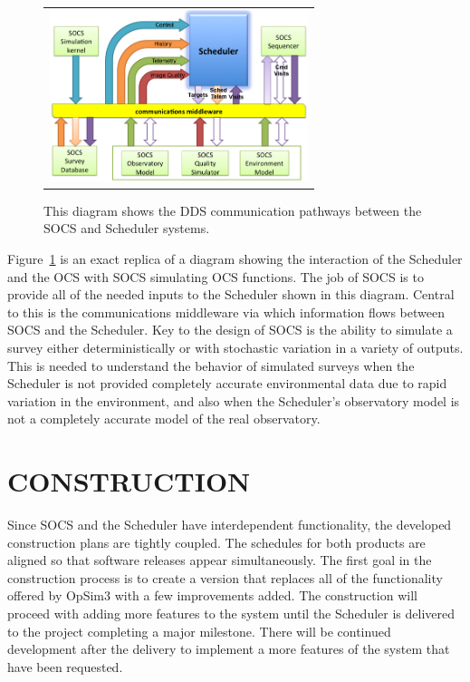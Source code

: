 \documentclass[]{spie}  %
\begin{document}
\begin{figure} [ht]
	\begin{center}
		\begin{tabular}{c}
			\includegraphics[height=5cm]{CommFlow.png}
		\end{tabular}
	\end{center}
	\caption[example]
	{ \label{fig:commflow} 
		This diagram shows the DDS communication pathways between the SOCS and Scheduler systems.}
\end{figure}

Figure~\ref*{fig:commflow} is an exact replica of a diagram showing the interaction of the Scheduler and the OCS with SOCS simulating OCS functions. The job of SOCS is to provide all of the needed inputs to the Scheduler shown in this diagram. Central to this is the communications middleware via which information flows between SOCS and the Scheduler. Key to the design of SOCS is the ability to simulate a survey either deterministically or with stochastic variation in a variety of outputs. This is needed to understand the behavior of simulated surveys when the Scheduler is not provided completely accurate environmental data due to rapid variation in the environment, and also when the Scheduler's observatory model is not a completely accurate model of the real observatory.

\section{CONSTRUCTION}
\label{sec:construction}

Since SOCS and the Scheduler have interdependent functionality, the developed construction plans are tightly coupled. The schedules for both products are aligned so that software releases appear simultaneously. The first goal in the construction process is to create a version that replaces all of the functionality offered by OpSim3 with a few improvements added. The construction will proceed with adding more features to the system until the Scheduler is delivered to the project completing a major milestone. There will be continued development after the delivery to implement a more features of the system that have been requested. 
\end{document}
